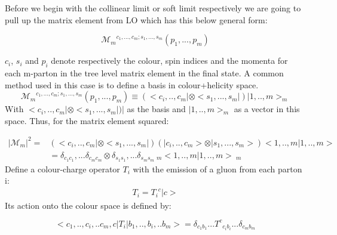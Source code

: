 Before we begin with the collinear limit or soft limit respectively we are going to pull up the matrix element from LO which has this below general form:

\begin{equation}
{\mathcal{M}_m}^{c_1,...,c_m;s_1,...,s_m}(p_1,..., p_m)
\end{equation}

$ c_i $, $ s_i $ and $ p_i $ denote respectively the colour, spin indices and the momenta for each m-parton in the tree level matrix element in the final state.
A common method used in this case is to define a basis in colour+helicity space.
\begin{equation}
{\mathcal{M}_m}^{c_1,...,c_m;s_1,...,s_m}(p_1,..., p_m)\equiv(<c_i,..,c_m|\otimes <s_1,...,s_m|)|1,..,m>_m
\end{equation}
With $ <c_i,..,c_m|\otimes <s_1,...,s_m|)| $ as the basis and $ |1,..,m>_m $ as a vector in this space.
Thus, for the matrix element squared:

\begin{equation}
\begin{split}
\vert \mathcal{M}_m \vert^2=& (< c_i,..,c_m | \otimes < s_1,...,s_m|)(| c_i,..,c_m > \otimes | s_1,...,s_m >) < 1,..,m | 1,..,m > \\
&=\delta_{c_1 c_1},...\delta_{c_m c_m} \otimes \delta_{s_1 s_1},...\delta_{s_ms_m} \:_m < 1,..,m | 1,..,m > \:_m
\end{split}
\end{equation}
Define a colour-charge operator  $ {T_i} $ with the
emission of a gluon from each parton i:
\begin{equation}
\begin{split}
T_i = {T_i}^c |c>
\end{split}
\end{equation}
Its action onto the colour space is defined by:

\begin{equation}
<c_1,..,c_i,..c_m,c|T_i|b_1,..,b_i,..b_m>=\delta_{c_1b_1}...{T^c}_{c_ib_i}
...\delta_{c_mb_m}
\end{equation}

